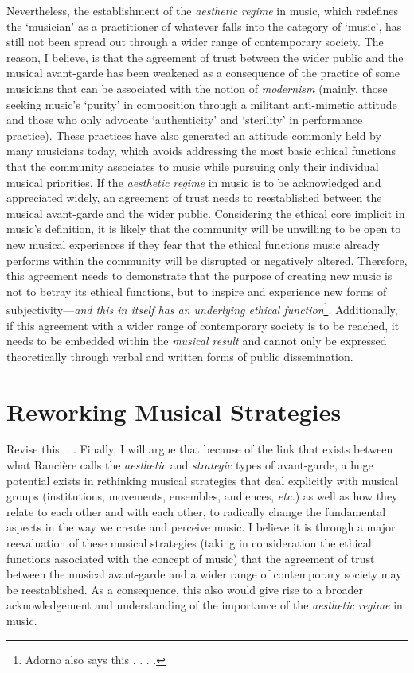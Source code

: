 Nevertheless, the establishment of the \emph{aesthetic regime} in music, which redefines the `musician' as a practitioner of whatever falls into the category of `music', has still not been spread out through a wider range of contemporary society. The reason, I believe, is that the agreement of trust between the wider public and the musical avant-garde has been weakened as a consequence of the practice of some musicians that can be associated with the notion of \emph{modernism} (mainly, those seeking music's `purity'  in composition through a militant anti-mimetic attitude and those who only advocate `authenticity' and `sterility' in performance practice). These practices have also generated an attitude commonly held by many musicians today, which avoids addressing the most basic ethical functions that the community associates to music while pursuing only their individual musical priorities. If the \emph{aesthetic regime} in music is to be acknowledged and appreciated widely, an agreement of trust needs to reestablished between the musical avant-garde and the wider public. Considering the ethical core implicit in music's definition, it is likely that the community will be unwilling to be open to new musical experiences if they fear that the ethical functions music already performs within the community will be disrupted or negatively altered. Therefore, this agreement needs to demonstrate that the purpose of creating new music is not to betray its ethical functions, but to inspire and experience new forms of subjectivity---\emph{and this in itself has an underlying ethical function}\footnote{Adorno also says this . . . .}. Additionally, if this agreement with a wider range of contemporary society is to be reached, it needs to be embedded within the \emph{musical result} and cannot only be expressed theoretically through verbal and written forms of public dissemination.

\section{Reworking Musical Strategies}

Revise this. . .
Finally, I will argue that because of the link that exists between what Ranci\`{e}re calls the \emph{aesthetic} and \emph{strategic} types of avant-garde, a huge potential exists in rethinking musical strategies that deal explicitly with musical groups (institutions, movements, ensembles, audiences, \emph{etc.}) as well as how they relate to each other and with each other, to radically change the fundamental aspects in the way we create and perceive music. I believe it is through a major reevaluation of these musical strategies (taking in consideration the ethical functions associated with the concept of music) that the agreement of trust between the musical avant-garde and a wider range of contemporary society may be reestablished. As a consequence, this also would give rise to a broader acknowledgement and understanding of the importance of the \emph{aesthetic regime} in music.

